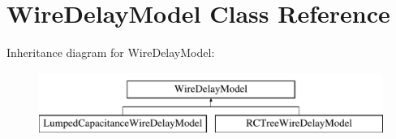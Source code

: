 \hypertarget{classWireDelayModel}{\section{Wire\-Delay\-Model Class Reference}
\label{classWireDelayModel}
}
Inheritance diagram for Wire\-Delay\-Model\-:\begin{figure}[H]
\begin{center}
\leavevmode
\includegraphics[height=2.000000cm]{classWireDelayModel}
\end{center}
\end{figure}
